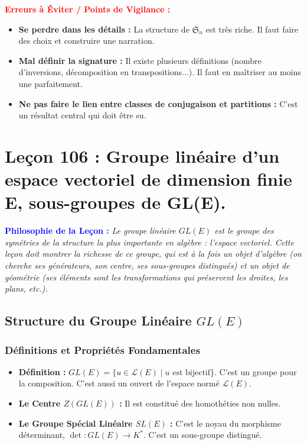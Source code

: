 \documentclass[12pt, a4paper, parskip=full]{report}
\theoremstyle{agregstyle}
\newenvironment{philosophie}
  {\par\medskip\noindent\begin{oframed}\noindent\textbf{\textcolor{blue}{Philosophie de la Leçon :}}\itshape}
  {\end{oframed}\par\medskip}
\newenvironment{erreurs}
  {\par\medskip\noindent\begin{oframed}\noindent\textbf{\textcolor{red}{Erreurs à Éviter / Points de Vigilance :}}}
  {\end{oframed}\par\medskip}
\begin{document}
\begin{erreurs}
    \begin{itemize}
        \item \textbf{Se perdre dans les détails :} La structure de $\mathfrak{S}_n$ est très riche. Il faut faire des choix et construire une narration.
        \item \textbf{Mal définir la signature :} Il existe plusieurs définitions (nombre d'inversions, décomposition en transpositions...). Il faut en maîtriser au moins une parfaitement.
        \item \textbf{Ne pas faire le lien entre classes de conjugaison et partitions :} C'est un résultat central qui doit être su.
    \end{itemize}
\end{erreurs}

\newpage
\chapter{Leçon 106 : Groupe linéaire d'un espace vectoriel de dimension finie E, sous-groupes de GL(E).}

\begin{philosophie}
    Le groupe linéaire $GL(E)$ est le groupe des symétries de la structure la plus importante en algèbre : l'espace vectoriel. Cette leçon doit montrer la richesse de ce groupe, qui est à la fois un objet d'algèbre (on cherche ses générateurs, son centre, ses sous-groupes distingués) et un objet de géométrie (ses éléments sont les transformations qui préservent les droites, les plans, etc.).
\end{philosophie}

\section{Structure du Groupe Linéaire $GL(E)$}
\subsection{Définitions et Propriétés Fondamentales}
\begin{itemize}
    \item \textbf{Définition :} $GL(E) = \{ u \in \mathcal{L}(E) \mid u \text{ est bijectif} \}$. C'est un groupe pour la composition. C'est aussi un ouvert de l'espace normé $\mathcal{L}(E)$.
    \item \textbf{Le Centre $Z(GL(E))$ :} Il est constitué des homothéties non nulles.
    \item \textbf{Le Groupe Spécial Linéaire $SL(E)$ :} C'est le noyau du morphisme déterminant, $\det: GL(E) \to K^*$. C'est un sous-groupe distingué.
\end{itemize}
\end{document}
